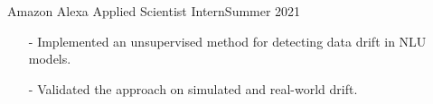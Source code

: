   {Amazon Alexa Applied Scientist Intern}{Summer 2021}{
  \begin{itemize}
      \item[-] Implemented an unsupervised method for detecting data drift in NLU models.
      \item[-] Validated the approach on simulated and real-world drift.
  \end{itemize}
   }{}